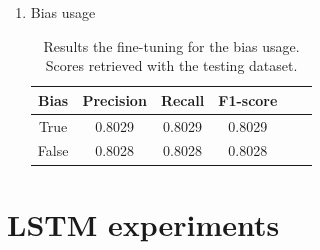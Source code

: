 \begin{enumerate}
    \item Bias usage
        \begin{table}[h]
            \centering
            \begin{tabular}{c|c|c|c|c|c}
                \textbf{Bias} & \textbf{Precision} & \textbf{Recall} & \textbf{F1-score} \\ \hline
                True      &   	0.8029  &   	0.8029  &   	0.8029  \\
                False        &   	0.8028  &   	0.8028  &   	0.8028  \\
            \end{tabular}
            \caption{Results the fine-tuning for the bias usage. Scores retrieved with the testing dataset.}
        \end{table}
        
        
    \end{enumerate}


\chapter{LSTM experiments}
\label{annex:lstm-experiments}